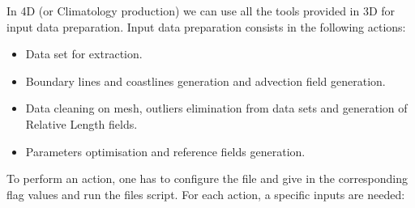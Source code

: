 In \diva 4D (or Climatology production) we can use all the tools provided in \diva 3D for input data preparation.
Input data preparation consists in the following actions:

\vspace{-0.5cm}

\begin{itemize}
\item Data set for extraction.
\item Boundary lines and coastlines generation and advection field generation.
\item Data cleaning on mesh, outliers elimination from data sets and generation of Relative Length fields.
\item Parameters optimisation and reference fields generation.
\end{itemize}


To perform an action, one has to configure the  file and give in the corresponding flag values and run the  files script. For each action, a specific inputs are needed:



